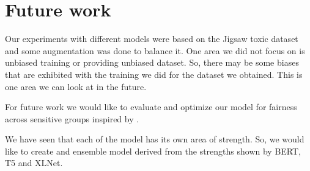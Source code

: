 \documentclass[11pt,a4paper]{article}
\begin{document}
\section{Future work}
Our experiments with different models were based on the Jigsaw toxic dataset and some augmentation was done to balance it. One area we did not focus on is unbiased training or providing unbiased dataset. So, there may be some biases that are exhibited with the training we did for the dataset we obtained. This is one area we can look at in the future.

For future work we would like to evaluate and optimize our model for fairness across sensitive groups inspired by \cite{baldini2021your}.

We have seen that each of the model has its own area of strength. So, we would like to create and  ensemble model derived from the strengths shown by BERT, T5 and XLNet. 



\end{document}
